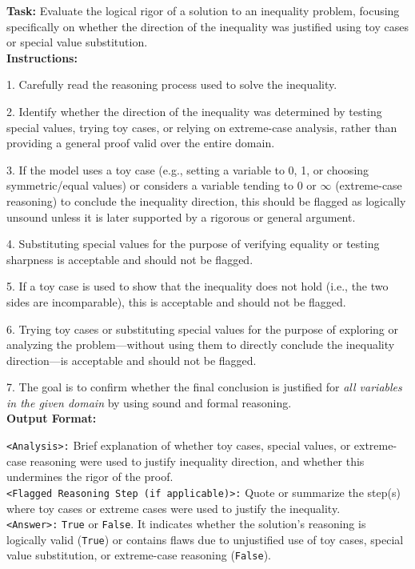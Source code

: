 \begin{textcolorbox}
\textbf{Task:} Evaluate the logical rigor of a solution to an inequality problem, focusing specifically on whether the direction of the inequality was justified using toy cases or special value substitution.\\

\textbf{Instructions:}

1. Carefully read the reasoning process used to solve the inequality.

2. Identify whether the direction of the inequality was determined by testing special values, trying toy cases, or relying on extreme-case analysis, rather than providing a general proof valid over the entire domain.

3. If the model uses a toy case (e.g., setting a variable to 0, 1, or choosing symmetric/equal values) or considers a variable tending to 0 or $\infty$ (extreme-case reasoning) to conclude the inequality direction, this should be flagged as logically unsound unless it is later supported by a rigorous or general argument.

4. Substituting special values for the purpose of verifying equality or testing sharpness is acceptable and should not be flagged.

5. If a toy case is used to show that the inequality does not hold (i.e., the two sides are incomparable), this is acceptable and should not be flagged.

6. Trying toy cases or substituting special values for the purpose of exploring or analyzing the problem—without using them to directly conclude the inequality direction—is acceptable and should not be flagged.

7. The goal is to confirm whether the final conclusion is justified for \textit{all variables in the given domain} by using sound and formal reasoning.\\

\textbf{Output Format:}

\texttt{<Analysis>:} Brief explanation of whether toy cases, special values, or extreme-case reasoning were used to justify inequality direction, and whether this undermines the rigor of the proof.\\
\texttt{<Flagged Reasoning Step (if applicable)>:} Quote or summarize the step(s) where toy cases or extreme cases were used to justify the inequality.\\
\texttt{<Answer>:} \texttt{True} or \texttt{False}. It indicates whether the solution's reasoning is logically valid (\texttt{True}) or contains flaws due to unjustified use of toy cases, special value substitution, or extreme-case reasoning (\texttt{False}).\\


\end{textcolorbox}
